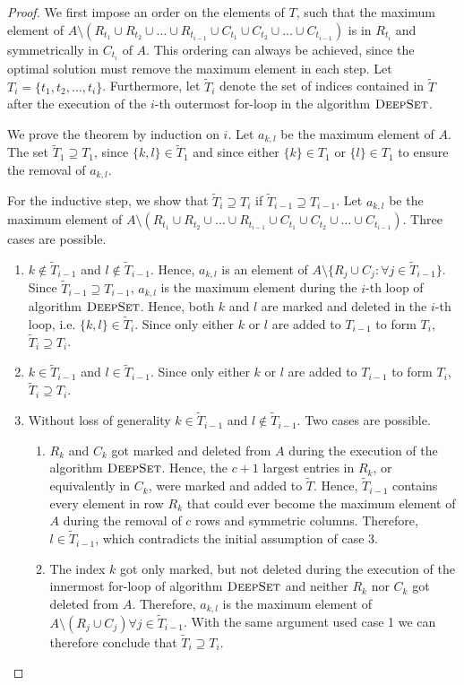 \documentclass[lotsofwhite]{patmorin}
\begin{document}
\begin{proof}
We first impose an order on the elements of $T$, such that the maximum element of $A \setminus (R_{t_1} \cup R_{t_2} \cup \ldots \cup R_{t_{i-1}} \cup C_{t_1} \cup C_{t_2} \cup \ldots \cup C_{t_{i-1}})$ is in $R_{t_i}$ and symmetrically in $C_{t_i}$ of $A$. This ordering can always be achieved, since the optimal solution must remove the maximum element in each step. Let $T_i = \{t_1,t_2,\ldots,t_i\}$. Furthermore, let $\tilde{T}_i$ denote the set of indices contained in $\tilde{T}$ after the execution of the $i$-th outermost for-loop in the algorithm $\textsc{DeepSet}$.

We prove the theorem by induction on $i$. Let $a_{k,l}$ be the maximum element of $A$. The set $\tilde{T}_1 \supseteq T_1$, since $\{k, l\} \in \tilde{T}_1$ and since either $\{k\} \in T_1$ or $\{l\} \in T_1$ to ensure the removal of $a_{k,l}$.

For the inductive step, we show that $\tilde{T}_i \supseteq T_i$ if $\tilde{T}_{i-1} \supseteq T_{i-1}$.
Let $a_{k,l}$ be the maximum element of $A \setminus (R_{t_1} \cup R_{t_2} \cup \ldots \cup R_{t_{i-1}} \cup C_{t_1} \cup C_{t_2} \cup \ldots \cup C_{t_{i-1}})$. Three cases are possible. 
\begin{enumerate}
\item $k \not \in \tilde{T}_{i-1}$ and $l \not \in \tilde{T}_{i-1}$. Hence, $a_{k,l}$ is an element of $A \setminus \{R_j \cup C_j : \forall j \in \tilde{T}_{i-1}\}$. Since $\tilde{T}_{i-1} \supseteq T_{i-1}$, $a_{k,l}$ is the maximum element during the $i$-th loop of algorithm $\textsc{DeepSet}$. Hence, both $k$ and $l$ are marked and deleted in the $i$-th loop, i.e. $\{k, l\} \in \tilde{T}_i$. Since only either $k$ or $l$ are added to $T_{i-1}$ to form $T_i$, $\tilde{T}_i \supseteq T_i$. 
\item $k \in \tilde{T}_{i-1}$ and $l \in \tilde{T}_{i-1}$. Since only either $k$ or $l$ are added to $T_{i-1}$ to form $T_i$, $\tilde{T}_i \supseteq T_i$. 
\item Without loss of generality $k \in \tilde{T}_{i-1}$ and $l \not \in \tilde{T}_{i-1}$. Two cases are possible.
\begin{enumerate}
\item $R_k$ and $C_k$ got marked and deleted from $A$ during the execution of the algorithm $\textsc{DeepSet}$. Hence, the $c+1$ largest entries in $R_k$, or equivalently in $C_k$, were marked and added to $\tilde{T}$. Hence, $\tilde{T}_{i-1}$ contains every element in row $R_k$ that could ever become the maximum element of $A$ during the removal of $c$ rows and symmetric columns. Therefore, $l \in \tilde{T}_{i-1}$, which contradicts the initial assumption of case 3.
\item The index $k$ got only marked, but not deleted during the execution of the innermost for-loop of algorithm $\textsc{DeepSet}$ and neither $R_k$ nor $C_k$ got deleted from $A$. Therefore, $a_{k,l}$ is the maximum element of $A \setminus (R_j \cup C_j) \forall j \in \tilde{T}_{i-1}$. With the same argument used case 1 we can therefore conclude that $\tilde{T}_i \supseteq T_i$. 
\end{enumerate}
\end{enumerate}
\end{proof} 
\end{document}
